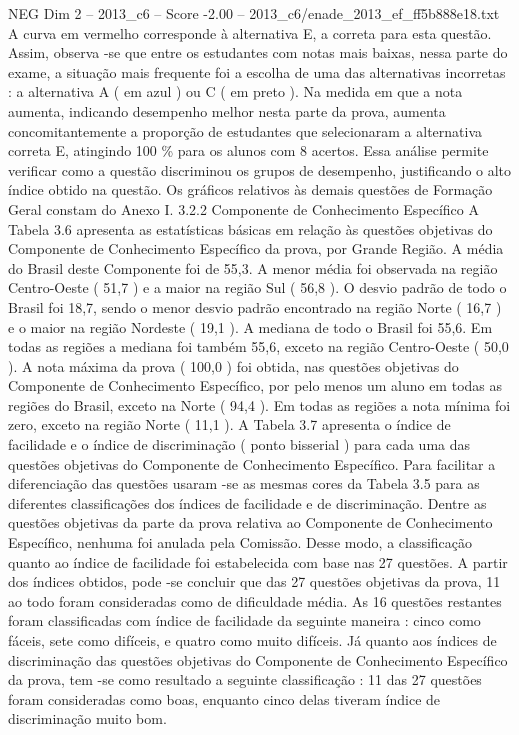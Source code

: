 \begin{textsample}{NEG Dim 2 – 2013\_c6 – Score -2.00 – 2013\_c6/enade\_2013\_ef\_ff5b888e18.txt}
A curva em vermelho corresponde à alternativa E, a correta para esta questão.
Assim, observa -se que entre os estudantes com notas mais baixas, nessa parte do exame, a situação mais frequente foi a escolha de uma das alternativas incorretas : a alternativa A ( em azul ) ou C ( em preto ).
Na medida em que a nota aumenta, indicando desempenho melhor nesta parte da prova, aumenta concomitantemente a proporção de estudantes que selecionaram a alternativa correta E, atingindo 100 \% para os alunos com 8 acertos.
Essa análise permite verificar como a questão discriminou os grupos de desempenho, justificando o alto índice obtido na questão.
Os gráficos relativos às demais questões de Formação Geral constam do Anexo I. 3.2.2 Componente de Conhecimento Específico A Tabela 3.6 apresenta as estatísticas básicas em relação às questões objetivas do Componente de Conhecimento Específico da prova, por Grande Região.
A média do Brasil deste Componente foi de 55,3.
A menor média foi observada na região Centro-Oeste ( 51,7 ) e a maior na região Sul ( 56,8 ).
O desvio padrão de todo o Brasil foi 18,7, sendo o menor desvio padrão encontrado na região Norte ( 16,7 ) e o maior na região Nordeste ( 19,1 ).
A mediana de todo o Brasil foi 55,6.
Em todas as regiões a mediana foi também 55,6, exceto na região Centro-Oeste ( 50,0 ).
A nota máxima da prova ( 100,0 ) foi obtida, nas questões objetivas do Componente de Conhecimento Específico, por pelo menos um aluno em todas as regiões do Brasil, exceto na Norte ( 94,4 ).
Em todas as regiões a nota mínima foi zero, exceto na região Norte ( 11,1 ).
A Tabela 3.7 apresenta o índice de facilidade e o índice de discriminação ( ponto bisserial ) para cada uma das questões objetivas do Componente de Conhecimento Específico.
Para facilitar a diferenciação das questões usaram -se as mesmas cores da Tabela 3.5 para as diferentes classificações dos índices de facilidade e de discriminação.
Dentre as questões objetivas da parte da prova relativa ao Componente de Conhecimento Específico, nenhuma foi anulada pela Comissão.
Desse modo, a classificação quanto ao índice de facilidade foi estabelecida com base nas 27 questões.
A partir dos índices obtidos, pode -se concluir que das 27 questões objetivas da prova, 11 ao todo foram consideradas como de dificuldade média.
As 16 questões restantes foram classificadas com índice de facilidade da seguinte maneira : cinco como fáceis, sete como difíceis, e quatro como muito difíceis.
Já quanto aos índices de discriminação das questões objetivas do Componente de Conhecimento Específico da prova, tem -se como resultado a seguinte classificação : 11 das 27 questões foram consideradas como boas, enquanto cinco delas tiveram índice de discriminação muito bom.

\end{textsample}
